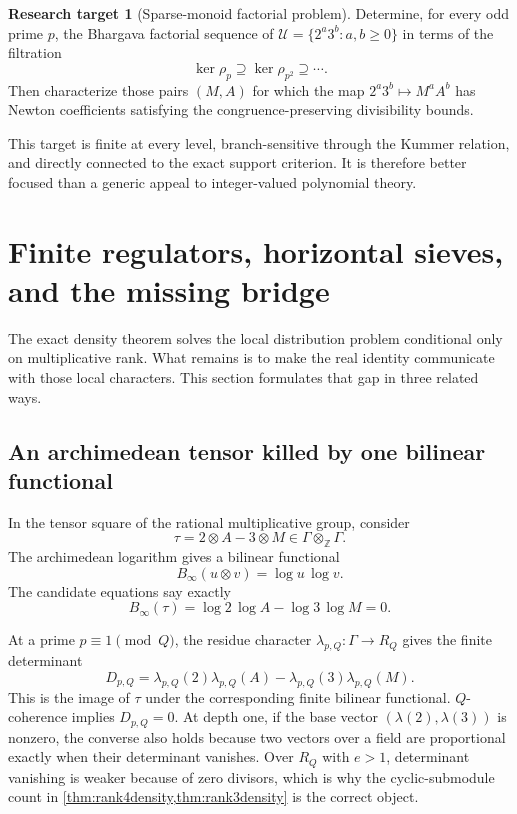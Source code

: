 \documentclass[11pt]{article}
\theoremstyle{definition}
\newtheorem{problem}[theorem]{Research target}
\theoremstyle{remark}
\newcommand{\Z}{\mathbb{Z}}
\begin{document}
\begin{problem}[Sparse-monoid factorial problem]\label{prob:factorial}
Determine, for every odd prime $p$, the Bhargava factorial sequence of
$\mathcal U=\{2^a3^b:a,b\ge0\}$ in terms of the filtration
\[
       \ker\rho_p\supseteq\ker\rho_{p^2}\supseteq\cdots.
\]
Then characterize those pairs $(M,A)$ for which the map $2^a3^b\mapsto M^aA^b$ has Newton
coefficients satisfying the congruence-preserving divisibility bounds.
\end{problem}

This target is finite at every level, branch-sensitive through the Kummer relation, and directly
connected to the exact support criterion.  It is therefore better focused than a generic appeal
to integer-valued polynomial theory.

\section{Finite regulators, horizontal sieves, and the missing bridge}
\label{sec:regulator}

The exact density theorem solves the local distribution problem conditional only on multiplicative
rank.  What remains is to make the real identity communicate with those local characters.  This
section formulates that gap in three related ways.

\subsection{An archimedean tensor killed by one bilinear functional}

In the tensor square of the rational multiplicative group, consider
\[
       \tau=2\otimes A-3\otimes M
       \in\Gamma\otimes_{\Z}\Gamma.
       \tag{10.1}\label{eq:tau}
\]
The archimedean logarithm gives a bilinear functional
\[
       B_\infty(u\otimes v)=\log u\,\log v.
\]
The candidate equations say exactly
\[
       B_\infty(\tau)
       =\log2\,\log A-\log3\,\log M=0.
       \tag{10.2}\label{eq:archdet}
\]

At a prime $p\equiv1\pmod Q$, the residue character
$\lambda_{p,Q}:\Gamma\to R_Q$ gives the finite determinant
\[
 D_{p,Q}
 =\lambda_{p,Q}(2)\lambda_{p,Q}(A)
  -\lambda_{p,Q}(3)\lambda_{p,Q}(M).
 \tag{10.3}\label{eq:finitedet}
\]
This is the image of $\tau$ under the corresponding finite bilinear functional.  $Q$-coherence
implies $D_{p,Q}=0$.  At depth one, if the base vector
$(\lambda(2),\lambda(3))$ is nonzero, the converse also holds because two vectors over a field
are proportional exactly when their determinant vanishes.  Over $R_Q$ with $e>1$, determinant
vanishing is weaker because of zero divisors, which is why the cyclic-submodule count in
\cref{thm:rank4density,thm:rank3density} is the correct object.
\end{document}
